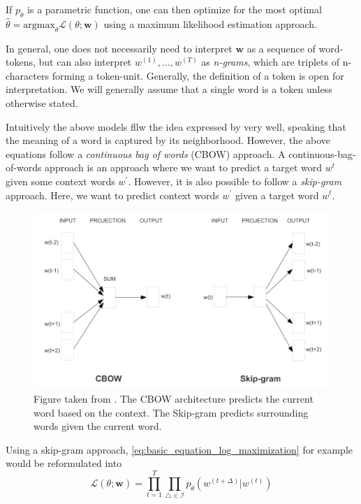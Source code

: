 \documentclass[a4paper,12pt,twoside,openright]{report}
\begin{document}

If $p_\theta$ is a parametric function, one can then optimize for the most optimal $\hat{\theta} = \text{argmax}_\theta \mathcal{L}(\theta ; \mathbf{w})$ using a maximum likelihood estimation approach.

In general, one does not necessarily need to interpret $\mathbf{w}$ as a sequence of word-tokens, but can also interpret $w^{(1)}, \ldots, w^{(T)}$ as \textit{n-grams}, which are triplets of n-characters forming a token-unit.
Generally, the definition of a token is open for interpretation. 
We will generally assume that a single word is a token unless otherwise stated.

Intuitively the above models fllw the idea expressed by \cite{harris54} very well, speaking that the meaning of a word is captured by its neighborhood.
However, the above equations follow a \textit{continuous bag of words } (CBOW) approach.
A continuous-bag-of-words approach is an approach where we want to predict a target word $w^t$ given some context words $w^{\prime}$.
However, it is also possible to follow a \textit{skip-gram} approach.
Here, we want to predict context words $w^{\prime}$ given a target word $w^t$.

\begin{figure}[h]
	\center
  \includegraphics[width=0.6\linewidth]{./assets/background/cbow_and_skipgram.png}
  \caption{Figure taken from \cite{mikolov13}. The CBOW architecture predicts the current word based on the context. The Skip-gram predicts surrounding words given the current word.}
  \label{fig:cbow_skipgram}
\end{figure}

Using a skip-gram approach, \eqref{eq:basic_equation_log_maximization} for example would be reformulated into 
\begin{equation}
\mathcal{L}(\theta ; \mathbf{w})=\prod_{t=1}^{T} \prod_{\triangle \in \mathcal{I}} p_{\theta}\left(w^{(t +\Delta)} | w^{(t)}\right)
\end{equation}{\label{eq:basic_equation_log_maximization_skipgram}}
\end{document}
